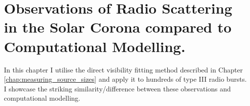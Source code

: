 \doublespacing
\chapter{Observations of Radio Scattering in the Solar Corona compared to Computational Modelling.}
\label{chap:observations_vs_theory}
In this chapter I utilise the direct visibility fitting method described in Chapter \ref{chap:measuring_source_sizes} and apply it to hundreds of type III radio bursts. I showcase the striking similarity/difference between these observations and computational modelling. 